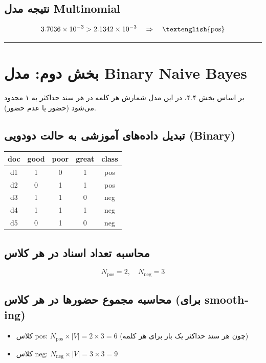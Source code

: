 \documentclass[11pt,a4paper]{article}
\newcommand{\en}[1]{\textenglish{#1}}
\newcommand{\separator}{\vspace{1em}\noindent\rule{\linewidth}{0.4pt}\vspace{1em}}
\begin{document}
\subsection*{نتیجه مدل \en{Multinomial}}
\[
3.7036 \times 10^{-3} > 2.1342 \times 10^{-3} \quad \Rightarrow \quad \text{\en{pos}}
\]

\separator
\section{بخش دوم: مدل \en{Binary Naive Bayes}}

بر اساس بخش ۴.۴، در این مدل شمارش هر کلمه در هر سند حداکثر به ۱ محدود می‌شود (حضور یا عدم حضور).

\subsection*{تبدیل داده‌های آموزشی به حالت دودویی (\en{Binary})}
\begin{center}
\begin{tabular}{|c|c|c|c|c|}
\hline
\textbf{\en{doc}} & \textbf{\en{good}} & \textbf{\en{poor}} & \textbf{\en{great}} & \textbf{\en{class}} \\
\hline
\en{d1} & 1 & 0 & 1 & \en{pos} \\
\hline
\en{d2} & 0 & 1 & 1 & \en{pos} \\
\hline
\en{d3} & 1 & 1 & 0 & \en{neg} \\
\hline
\en{d4} & 1 & 1 & 1 & \en{neg} \\
\hline
\en{d5} & 0 & 1 & 0 & \en{neg} \\
\hline
\end{tabular}
\end{center}

\subsection*{محاسبه تعداد اسناد در هر کلاس}
\[
N_{\text{pos}} = 2, \quad N_{\text{neg}} = 3
\]

\subsection*{محاسبه مجموع حضورها در هر کلاس (برای \en{smoothing})}
\begin{itemize}
\item کلاس \en{pos}: $N_{\text{pos}} \times |V| = 2 \times 3 = 6$ (چون هر سند حداکثر یک بار برای هر کلمه)
\item کلاس \en{neg}: $N_{\text{neg}} \times |V| = 3 \times 3 = 9$
\end{itemize}
\end{document}

